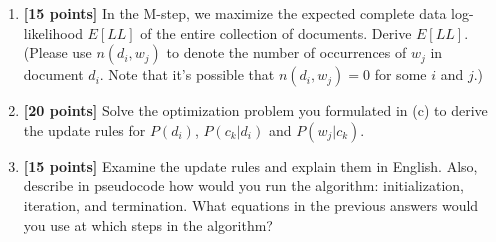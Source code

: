 \begin{enumerate}
\begin{enumerate}
      \item {\bf [15 points]}
        In the M-step, we maximize the expected complete data 
        log-likelihood $E[LL]$ of the entire collection of documents. Derive 
        $E[LL]$. (Please use $n(d_i, w_j)$ to denote the number of occurrences 
        of $w_j$ in document $d_i$. Note that it's possible that 
        $n(d_i, w_j)=0$ for some $i$ and $j$.)

      \item {\bf [20 points]}
        Solve the optimization problem you formulated in (c) to derive the update rules for
        $P(d_i)$, $P(c_k | d_i)$ and $P(w_j | c_k)$.

      \item {\bf [15 points]}
        Examine the update rules and explain them in English. Also, describe 
        in pseudocode how would you run the algorithm: initialization, iteration, 
        and termination. What equations in the previous answers would you use 
        at which steps in the algorithm?

    \end{enumerate}





\end{enumerate}
